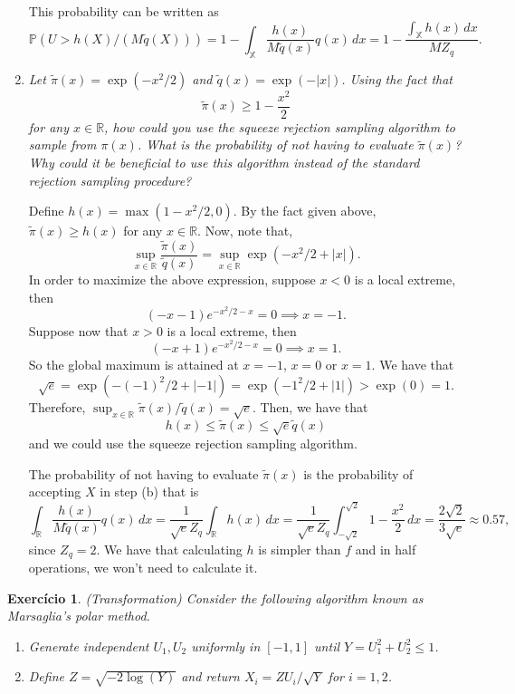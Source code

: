 \documentclass[a4paper,12pt]{article}
\newcommand{\R}{\mathbb{R}}
\newcommand{\pr}{\mathbb{P}}
\newtheorem{exercise}{Exercício}
\theoremstyle{definition}
\begin{document}
\begin{enumerate}
    This probability can be written as 
    $$
    \pr\left(U > h(X) / (M\tilde{q}(X))\right) = 1 - \int_{\mathbb{X}} \frac{h(x)}{M\tilde{q}(x)} q(x) \, dx = 1 - \frac{\int_{\mathbb{X}} h(x) \, dx}{MZ_q}.
    $$

    \item {\it Let $\tilde{\pi}(x) = \exp(-x^2/2)$ and $\tilde{q}(x) =
    \exp(-|x|)$. Using the fact that }
    $$
    \tilde{\pi}(x) \ge 1 - \frac{x^2}{2}
    $$
    {\it 
    for any $x \in \R$, how could you use the squeeze rejection sampling
    algorithm to sample from $\pi(x)$. What is the probability of not having
    to evaluate $\tilde{\pi}(x)$? Why could it be beneficial to use this
    algorithm instead of the standard rejection sampling procedure?}

    Define $h(x) = \max(1 - x^2/2, 0)$. By the fact given above,
    $\tilde{\pi}(x) \ge h(x)$ for any $x \in \R$. Now, note that, 
    $$
    \sup_{x \in \R} \frac{\tilde{\pi}(x)}{\tilde{q}(x)} = \sup_{x \in \R} \exp(-x^2/2 + |x|).
    $$
    In order to maximize the above expression, suppose $x < 0$ is a
    local extreme, then 
    $$
    (-x - 1)e^{-x^2/2 - x} = 0 \implies x = -1. 
    $$
    Suppose now that $x > 0$ is a local extreme, then 
    $$
    (-x + 1)e^{-x^2/2 - x} = 0 \implies x = 1. 
    $$
    So the global maximum is attained at $x = -1$, $x = 0$ or $x = 1$. We have
    that 
    $$
    \sqrt{e} = \exp(-(-1)^2/2 + |-1|) = \exp(-1^2/2 + |1|) > \exp(0) = 1.
    $$
    Therefore, $\sup_{x \in \R} \tilde{\pi}(x)/\tilde{q}(x) = \sqrt{e}$. 
    Then, we have that 
    $$
    h(x) \le \tilde{\pi}(x) \le \sqrt{e} \tilde{q}(x)
    $$
    and we could use the  squeeze rejection sampling algorithm. 

    The probability of not having to evaluate $\tilde{\pi}(x)$ is the
    probability of accepting $X$ in step (b) that is 
    $$
    \int_{\R} \frac{h(x)}{M\tilde{q}(x)}q(x) \, dx = \frac{1}{\sqrt{e}Z_{q}}\int_{\R} h(x) \, dx = \frac{1}{\sqrt{e} Z_q} \int_{-\sqrt{2}}^{\sqrt{2}} 1 - \frac{x^2}{2} \, dx = \frac{2\sqrt{2}}{3\sqrt{e}} \approx 0.57, 
    $$
    since $Z_q = 2$. We have that calculating $h$ is simpler than $f$ and in
    half operations, we won't need to calculate it.  
\end{enumerate}

\begin{exercise}
    (Transformation)
    Consider the following algorithm known as Marsaglia's polar method.
    \begin{enumerate}[{\bf Step (a)}] 
    \item Generate independent $U_1, U_2$
    uniformly in $[-1,1]$ until $Y = U_1^2 + U_2^2 \le 1$.  
    \item Define $Z = \sqrt{-2\log(Y)}$ and return $X_i = Z U_i/\sqrt{Y}$ for $i=1,2$.
    \end{enumerate}
\end{exercise}
\end{document}
